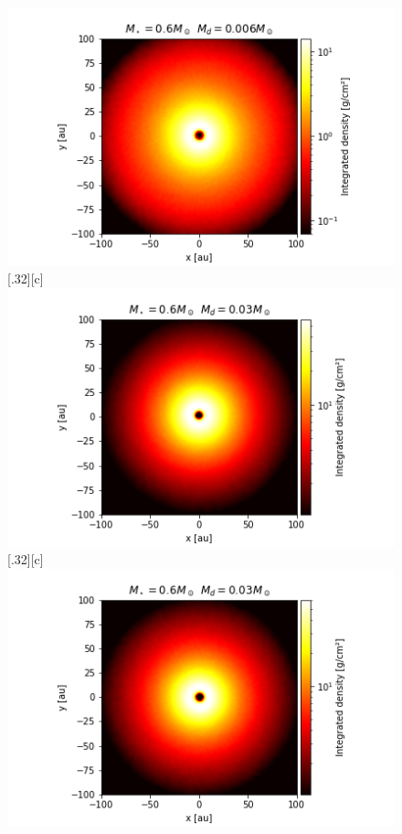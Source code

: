 \documentclass[aps,prb,twocolumn,superscriptaddress,floatfix,longbibliography]{revtex4-2}
\begin{document}
\begin{appendices}
\begin{figure}[!htbp]
{    \includegraphics[width=\linewidth]{Graphs_2D/r_0.6s_0.006d_0.7q_2D.png}}\quad
  \subcaptionbox*{}[.32\linewidth][c]{%
    \includegraphics[width=1\linewidth]{Graphs_2D/r_0.6s_0.03d_0.3q_2D.png}}\quad
  \subcaptionbox*{}[.32\linewidth][c]{%
    \includegraphics[width=\linewidth]{Graphs_2D/r_0.6s_0.03d_0.5q_2D.png}}\quad

\end{figure}
\end{appendices}
\end{document}
